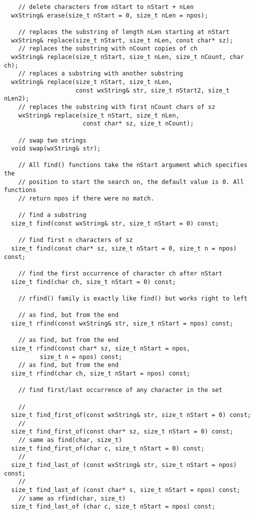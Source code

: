 \begin{verbatim}
    // delete characters from nStart to nStart + nLen
  wxString& erase(size_t nStart = 0, size_t nLen = npos);

    // replaces the substring of length nLen starting at nStart
  wxString& replace(size_t nStart, size_t nLen, const char* sz);
    // replaces the substring with nCount copies of ch
  wxString& replace(size_t nStart, size_t nLen, size_t nCount, char ch);
    // replaces a substring with another substring
  wxString& replace(size_t nStart, size_t nLen,
                    const wxString& str, size_t nStart2, size_t nLen2);
    // replaces the substring with first nCount chars of sz
    wxString& replace(size_t nStart, size_t nLen,
                      const char* sz, size_t nCount);

    // swap two strings
  void swap(wxString& str);

    // All find() functions take the nStart argument which specifies the
    // position to start the search on, the default value is 0. All functions
    // return npos if there were no match.

    // find a substring
  size_t find(const wxString& str, size_t nStart = 0) const;

    // find first n characters of sz
  size_t find(const char* sz, size_t nStart = 0, size_t n = npos) const;

    // find the first occurrence of character ch after nStart
  size_t find(char ch, size_t nStart = 0) const;

    // rfind() family is exactly like find() but works right to left

    // as find, but from the end
  size_t rfind(const wxString& str, size_t nStart = npos) const;

    // as find, but from the end
  size_t rfind(const char* sz, size_t nStart = npos,
          size_t n = npos) const;
    // as find, but from the end
  size_t rfind(char ch, size_t nStart = npos) const;

    // find first/last occurrence of any character in the set

    //
  size_t find_first_of(const wxString& str, size_t nStart = 0) const;
    //
  size_t find_first_of(const char* sz, size_t nStart = 0) const;
    // same as find(char, size_t)
  size_t find_first_of(char c, size_t nStart = 0) const;
    //
  size_t find_last_of (const wxString& str, size_t nStart = npos) const;
    //
  size_t find_last_of (const char* s, size_t nStart = npos) const;
    // same as rfind(char, size_t)
  size_t find_last_of (char c, size_t nStart = npos) const;


\end{verbatim}

